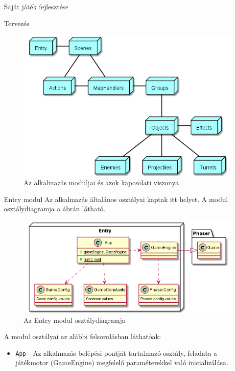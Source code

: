 \begin{MyChapter}{Saját játék fejlesztése}
\begin{MySection}{Tervezés}
		\begin{figure}[h!]
			\centering
			\includegraphics[width=1\textwidth]{kepek/uml/modules.png}
			\caption{Az alkalmazás moduljai és azok kapcsolati viszonya}
			\label{fig:uml:module}
		\end{figure}
		
		
		\begin{MySubSection}{Entry modul}
			Az alkalmazás általános osztályai kaptak itt helyet.
			A modul osztálydiagramja a  ábrán látható.
			
			\begin{figure}[h!]
				\centering
				\includegraphics[scale=0.8]{kepek/uml/entry/entry.png}
				\caption{Az Entry modul osztálydiagramja}
				\label{fig:uml:entry}
			\end{figure}
		
			A modul osztályai az alábbi felsorolásban láthatóak:
			\begin{itemize}
				\item \texttt{App} - Az alkalmazás belépési pontját tartalmazó osztály, feladata a játékmotor (GameEngine) megfelelő paraméterekkel való inicializálása.
				

\end{itemize}
\end{MySubSection}
\end{MySection}
\end{MyChapter}
